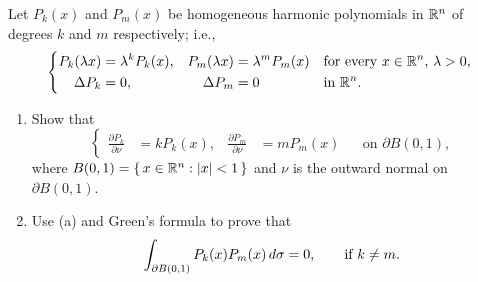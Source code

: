 \begin{problem}
  Let \(P_k(x)\) and \(P_m(x)\) be homogeneous harmonic polynomials in
  \(\mathbb{R}^n\) of degrees \(k\) and \(m\) respectively; i.e.,
  \[
    \left\{%
      \begin{aligned}
        P_k(\lambda x)&=\lambda^k P_k(x),&P_m(\lambda x)&=\lambda^m P_m(x)
        &&\text{for every \(x\in\bbR^n\), \(\lambda>0\),}\\
        \Delta P_k&=0,&\Delta P_m&=0&&\text{in \(\bbR^n\).}
      \end{aligned}
    \right.
  \]
  \begin{enumerate}[label=(\alph*),noitemsep]
  \item Show that
    \[
      \left\{%
        \begin{aligned}
          \frac{\partial P_k}{\partial \nu}&=kP_k(x),& \frac{\partial
            P_m}{\partial\nu}&=mP_m(x)&&\text{on \(\partial B(0,1)\),}
        \end{aligned}
      \right.
    \]
    where \(B(0,1)=\{\,x\in\mathbb{R}^n:|x|<1\,\}\) and \(\nu\) is the outward
    normal
    on \(\partial B(0,1)\).
  \item Use (a) and Green's formula to prove that
    \[
      \int_{\partial B(0,1)}P_k(x)P_m(x)\mathop{}\!d\sigma=0,\qquad\text{if
        \(k\neq m\).}
    \]
  \end{enumerate}
\end{problem}
